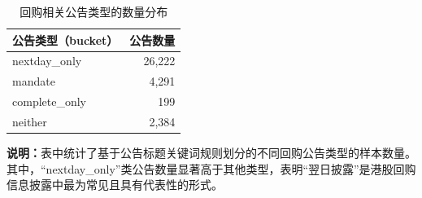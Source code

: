 \documentclass[a4paper,10pt]{article}
\begin{document}
\begin{table}[H]
    \centering
    \caption{回购相关公告类型的数量分布}
    \label{tab:announcement_bucket_dist}
    \renewcommand{\arraystretch}{1.2}
    \begin{tabular}{l r}
        \toprule
        \textbf{公告类型（bucket）} & \textbf{公告数量} \\
        \midrule
        nextday\_only   & 26{,}222 \\
        mandate        & 4{,}291 \\
        complete\_only & 199 \\
        neither        & 2{,}384 \\
        \bottomrule
    \end{tabular}
    \vspace{0.2cm}
    \begin{flushleft}
        \footnotesize
        \textbf{说明：}表中统计了基于公告标题关键词规则划分的不同回购公告类型的样本数量。其中，“nextday\_only”类公告数量显著高于其他类型，表明“翌日披露”是港股回购信息披露中最为常见且具有代表性的形式。
    \end{flushleft}
\end{table}







































\end{document}
